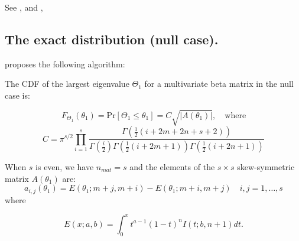 See \cite{Chiani_2012}, and  \cite{Johnstone_2013},




\subsection{The exact distribution (null case).}
\cite{Chiani_2014} proposes the following algorithm:

The CDF of the largest eigenvalue $\Theta_1$ for a multivariate beta matrix
in the null case is:

\begin{equation}
	F_{\Theta_1}(\theta_1) = \text{Pr}[\Theta_1 \leq \theta_1] = C \sqrt{|A(\theta_1)|}, \quad \text{where}
\end{equation}
\begin{equation}
	C= \pi^{s/2} \prod_{i=1}^s \frac{\Gamma\left(\tfrac{1}{2} (i+2m+2n+s+2)  \right)}{\Gamma\left(\tfrac{i}{2}   \right)\Gamma\left(\tfrac{1}{2} (i+2m+1)   \right)\Gamma\left(\tfrac{1}{2} (i+2n+1)  \right)}
\end{equation}

When $s$ is even, we have $n_{mat} = s$ and the elements of the $s \times s$ skew-symmetric matrix $A(\theta_1)$ are:
\begin{equation}
	a_{i,j}(\theta_1) = E (\theta_1;m + j,m + i) - E (\theta_1;m + i,m + j) \quad i, j = 1, \ldots, s \label{eq:RoyMatrixElements}
\end{equation}
where

\begin{equation}
	E(x;a,b) = \int_{0}^x t^{a-1} (1-t)^n I(t;b,n+1) dt. \label{eq:RoyMatrixIntegral}
\end{equation}

